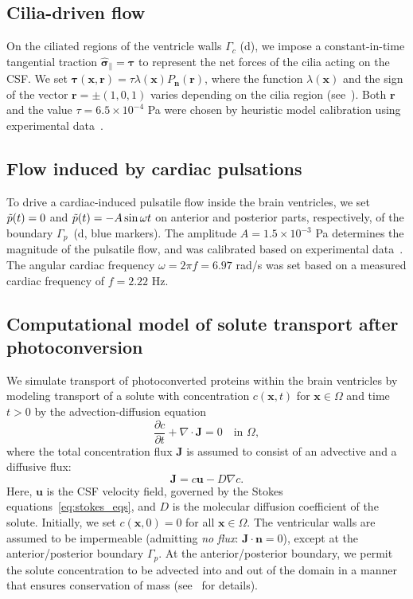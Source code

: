 \documentclass[fleqn]{wlscirep}
\newcommand{\pdifft}[1]{\frac{\partial  #1}{\partial t}}
\newcommand{\Gc}{\Gamma_{c}}
\newcommand{\Gp}{\Gamma_{p}}
\newcommand{\nn}{\mathbf{n}}
\newcommand{\rr}{\mathbf{r}}
\newcommand{\uu}{\mathbf{u}}
\newcommand{\xx}{\bm{x}}
\newcommand{\JJ}{\mathbf{J}}
\newcommand{\bsig}{\bm{\sigma}}
\newcommand{\bsigpar}{\hat{\bsig}_{\parallel}}
\newcommand{\btau}{\bm{\tau}}
\begin{document}
\subsection*{Cilia-driven flow}
On the ciliated regions of the ventricle walls $\Gc$ (d),
we impose a constant-in-time tangential traction $\bsigpar=\btau$ to represent the net forces of the cilia acting on the CSF.
We set $\btau(\xx, \rr) = \tau \lambda(\xx) P_{\nn}(\rr)$, where the function $\lambda(\xx)$
and the sign of the vector $\rr=\pm(1, 0, 1)$ varies depending on the cilia region (see~).
Both $\rr$ and the value $\tau=6.5\times 10^{-4}$ Pa were chosen by heuristic
model calibration using experimental data~\cite{Olstad2019CiliaryDevelopment}.

\subsection*{Flow induced by cardiac pulsations}\label{subsec:pressure_bcs}
To drive a cardiac-induced pulsatile flow inside the brain ventricles, we set $\Tilde{p}(t)=0$ and
$\Tilde{p}(t)=-A\sin{\omega t}$ on anterior and posterior parts, respectively, of the boundary $\Gp$~(d, blue markers).
The amplitude $A=1.5\times 10^{-3}$ Pa determines the magnitude of the pulsatile flow,
and was calibrated based on experimental data~\cite{Olstad2019CiliaryDevelopment}.
The angular cardiac frequency $\omega=2\pi f=6.97$ rad/s was set based on a measured cardiac frequency of $f=2.22$ Hz.

\subsection*{Computational model of solute transport after photoconversion}
We simulate transport of photoconverted proteins within the brain ventricles by
modeling transport of a solute with concentration $c(\xx, t)$ for $\xx\in\Omega$ and
time $t > 0$ by the advection-diffusion equation
\begin{equation}
    \pdifft{c} + \nabla\cdot\JJ = 0 \quad \text{in } \Omega,
    \label{eq:adv_diff_strong}
\end{equation}
where the total concentration flux $\mathbf{J}$ is assumed to consist of an advective and a diffusive flux:
\begin{equation*}
    \JJ = c\uu - D\nabla c .
\end{equation*}
Here, $\uu$ is the CSF velocity field, governed by the Stokes equations~\eqref{eq:stokes_eqs},
and $D$ is the molecular diffusion coefficient of the solute.
Initially, we set $c(\xx, 0)=0$ for all $\xx\in\Omega$.
The ventricular walls are assumed to be impermeable (admitting \emph{no flux}: $\JJ\cdot\nn=0$),
except at the anterior/posterior boundary $\Gamma_p$.
At the anterior/posterior boundary, we permit the solute concentration to be advected into
and out of the domain in a manner that ensures conservation of mass (see~ for details).
\end{document}
